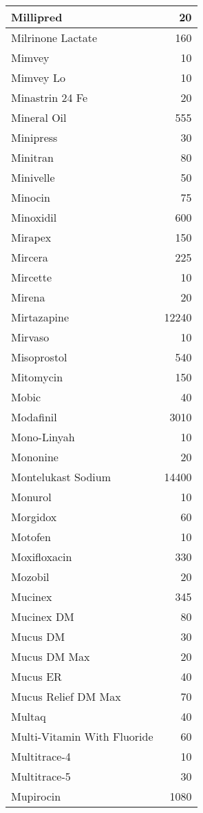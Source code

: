 \documentclass[
]{article}
\begin{document}
\begin{table}
\begin{tabular}[t]{l|r}
\hline
Millipred & 20\\
\hline
Milrinone Lactate & 160\\
\hline
Mimvey & 10\\
\hline
Mimvey Lo & 10\\
\hline
Minastrin 24 Fe & 20\\
\hline
Mineral Oil & 555\\
\hline
Minipress & 30\\
\hline
Minitran & 80\\
\hline
Minivelle & 50\\
\hline
Minocin & 75\\
\hline
Minoxidil & 600\\
\hline
Mirapex & 150\\
\hline
Mircera & 225\\
\hline
Mircette & 10\\
\hline
Mirena & 20\\
\hline
Mirtazapine & 12240\\
\hline
Mirvaso & 10\\
\hline
Misoprostol & 540\\
\hline
Mitomycin & 150\\
\hline
Mobic & 40\\
\hline
Modafinil & 3010\\
\hline
Mono-Linyah & 10\\
\hline
Mononine & 20\\
\hline
Montelukast Sodium & 14400\\
\hline
Monurol & 10\\
\hline
Morgidox & 60\\
\hline
Motofen & 10\\
\hline
Moxifloxacin & 330\\
\hline
Mozobil & 20\\
\hline
Mucinex & 345\\
\hline
Mucinex DM & 80\\
\hline
Mucus DM & 30\\
\hline
Mucus DM Max & 20\\
\hline
Mucus ER & 40\\
\hline
Mucus Relief DM Max & 70\\
\hline
Multaq & 40\\
\hline
Multi-Vitamin With Fluoride & 60\\
\hline
Multitrace-4 & 10\\
\hline
Multitrace-5 & 30\\
\hline
Mupirocin & 1080\\

\end{tabular}
\end{table}
\end{document}
